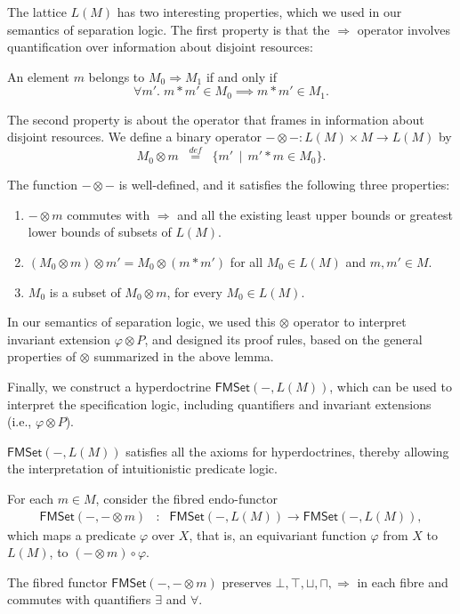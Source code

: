 \documentclass{LMCS}
\newcommand{\defeq}{\stackrel{\mathit{def}}{=}}
\begin{document}
The lattice $L(M)$ has two interesting properties, which
we used in our semantics of separation logic.
The first property is that the $\Rightarrow$ operator
involves quantification over information about disjoint
resources:
\begin{lem}
An element $m$ belongs to $M_0\Rightarrow M_1$ if and only if
$$
\forall m'.\; m*m' \in M_0 \implies m*m' \in M_1.
$$
\end{lem}
The second property is about the operator that frames in
information about disjoint resources. We define
a binary operator $-\otimes - : L(M) \times M \rightarrow L(M)$ 
by
$$
    M_0 \otimes m \;\;\defeq\;\; 
   \{ m' \,\mid\, m' * m \in M_0\}.
$$
\begin{lem}
The function $-\otimes -$ is well-defined, and it satisfies
the following three properties:
\begin{enumerate}
\item $-\otimes m$ 
commutes with $\Rightarrow$ and all the existing
least upper bounds or greatest lower bounds of subsets of $L(M)$.
\item $(M_0 \otimes m) \otimes m' = M_0 \otimes (m*m')$ 
for all $M_0 \in L(M)$ and $m,m' \in M$. 
\item  $M_0$ is a subset of $M_0 \otimes m$, 
for every $M_0 \in L(M)$.
\end{enumerate}
\end{lem}
In our semantics of separation logic, we used this $\otimes$ operator
to interpret invariant extension $\varphi\otimes P$, and designed
its proof rules, based on the general 
properties of $\otimes$ summarized in the above lemma.

Finally, we construct a hyperdoctrine $\mathsf{FMSet}(-,L(M))$, which can
be used to interpret the specification logic, including quantifiers and
invariant extensions (i.e., $\varphi \otimes P$).
\begin{lem}
\label{lem:hyperdoctrine}
$\mathsf{FMSet}(-,L(M))$ satisfies
all the axioms for hyperdoctrines, thereby allowing
the interpretation of intuitionistic predicate logic.
\end{lem}
For each $m \in M$,
consider the fibred endo-functor 
$$
\begin{array}{rcl}
\mathsf{FMSet}(-,-\otimes m)
& : & 
\mathsf{FMSet}(-,L(M))
\rightarrow 
\mathsf{FMSet}(-,L(M)),
\end{array}
$$
which maps a predicate $\varphi$ over $X$,
that is, an equivariant function $\varphi$ from
$X$ to $L(M)$, to $(-\otimes m) \circ \varphi$.
\begin{lem}
The fibred functor $\mathsf{FMSet}(-,-\otimes m)$
preserves $\bot,\top,\sqcup,\sqcap,\Rightarrow$ in each fibre
and commutes with quantifiers $\exists$ and $\forall$.
\end{lem}
\end{document}
